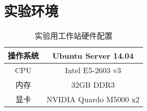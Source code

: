 \chapter{实验环境}

\begin{table}[ht]
\centering
\caption{实验用工作站硬件配置}\label{Tab:WorkstationInfo}
\begin{tabular}{|c|c|}
\hline
操作系统 & Ubuntu Server 14.04 \\
\hline
CPU & Intel E5-2603 v3 \\
\hline
内存 & 32GB DDR3 \\
\hline
显卡 & NVIDIA Quardo M5000 x2 \\
\hline
\end{tabular}
\end{table}